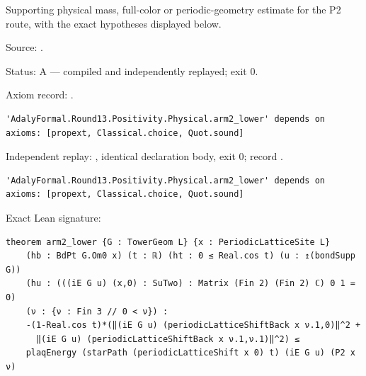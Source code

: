 \begin{theorem}[bp-485]
\label{bp-485}
\leanok
Supporting physical mass, full-color or periodic-geometry estimate for the P2 route, with the exact hypotheses displayed below.

\par Source: \texttt{}.
\par Status: A — compiled and independently replayed; exit 0.
\par Axiom record: \texttt{}.
\begin{verbatim}
'AdalyFormal.Round13.Positivity.Physical.arm2_lower' depends on axioms: [propext, Classical.choice, Quot.sound]
\end{verbatim}
\par Independent replay: \texttt{}, identical declaration body, exit 0; record \texttt{}.
\begin{verbatim}
'AdalyFormal.Round13.Positivity.Physical.arm2_lower' depends on axioms: [propext, Classical.choice, Quot.sound]
\end{verbatim}
\par Exact Lean signature:
\begin{verbatim}
theorem arm2_lower {G : TowerGeom L} {x : PeriodicLatticeSite L}
    (hb : BdPt G.Om0 x) (t : ℝ) (ht : 0 ≤ Real.cos t) (u : ↥(bondSupp G))
    (hu : (((iE G u) (x,0) : SuTwo) : Matrix (Fin 2) (Fin 2) ℂ) 0 1 = 0)
    (ν : {ν : Fin 3 // 0 < ν}) :
    -(1-Real.cos t)*(‖(iE G u) (periodicLatticeShiftBack x ν.1,0)‖^2 +
      ‖(iE G u) (periodicLatticeShiftBack x ν.1,ν.1)‖^2) ≤
    plaqEnergy (starPath (periodicLatticeShift x 0) t) (iE G u) (P2 x ν)
\end{verbatim}
\end{theorem}

